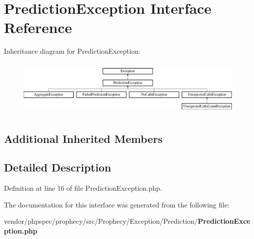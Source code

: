 \section{Prediction\+Exception Interface Reference}
\label{interface_prophecy_1_1_exception_1_1_prediction_1_1_prediction_exception}
Inheritance diagram for Prediction\+Exception\+:\begin{figure}[H]
\begin{center}
\leavevmode
\includegraphics[height=2.772277cm]{interface_prophecy_1_1_exception_1_1_prediction_1_1_prediction_exception}
\end{center}
\end{figure}
\subsection*{Additional Inherited Members}


\subsection{Detailed Description}


Definition at line 16 of file Prediction\+Exception.\+php.



The documentation for this interface was generated from the following file\+:\begin{DoxyCompactItemize}
\item 
vendor/phpspec/prophecy/src/\+Prophecy/\+Exception/\+Prediction/{\bf Prediction\+Exception.\+php}\end{DoxyCompactItemize}
